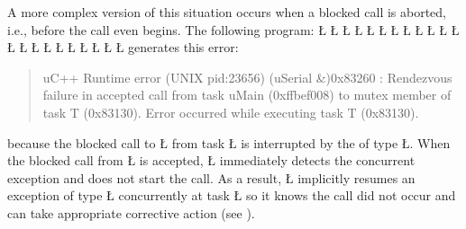 \documentclass[openright,twoside]{report}
\begin{document}
A more complex version of this situation occurs when a blocked call is aborted, i.e., before the call even begins.
The following program:
\LGinlinefalse\LGbegin\lgrinde
\L{}
\L{\LB{}}
\L{}
\L{\LB{}}
\L{}
\L{\LB{}}
\L{\LB{}}
\L{}
\L{\LB{}}
\L{\LB{}}
\L{\LB{}}
\L{\LB{}}
\L{\LB{\};}}
\endlgrinde\LGend
\LGinlinefalse\LGbegin\lgrinde
\L{}
\L{\LB{}}
\L{\LB{}}
\L{\LB{}}
\L{\LB{}}
\L{\LB{}}
\L{\LB{}}
\L{\LB{}}
\L{\LB{\}}}
\endlgrinde\LGend
generates this error:
\begin{quote}
\BGfont
uC++ Runtime error (UNIX pid:23656) (uSerial \&)0x83260 : Rendezvous failure in accepted call from task uMain (0xffbef008) to mutex member of task T (0x83130).
Error occurred while executing task T (0x83130).
\end{quote}
because the blocked call to \LGinlinetrue\LGbegin\lgrinde\L{}\endlgrinde\LGend{} from task \LGinlinetrue\LGbegin\lgrinde\L{}\endlgrinde\LGend{} is interrupted by the  of type \LGinlinetrue\LGbegin\lgrinde\L{}\endlgrinde\LGend{}.
When the blocked call from \LGinlinetrue\LGbegin\lgrinde\L{}\endlgrinde\LGend{} is accepted, \LGinlinetrue\LGbegin\lgrinde\L{}\endlgrinde\LGend{} immediately detects the concurrent exception and does not start the call.
As a result, \LGinlinetrue\LGbegin\lgrinde\L{}\endlgrinde\LGend{} implicitly resumes an exception of type \LGinlinetrue\LGbegin\lgrinde\L{}\endlgrinde\LGend{} concurrently at task \LGinlinetrue\LGbegin\lgrinde\L{}\endlgrinde\LGend{} so it knows the call did not occur and can take appropriate corrective action (see ).
\end{document}
